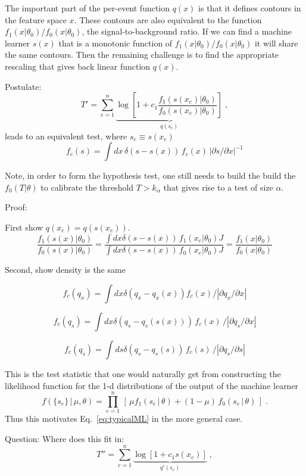 \documentclass[11pt, oneside]{article}   	%
\begin{document}
The important part of the per-event function $q(x)$ is that it defines contours in the feature space $x$. These contours are also equivalent to the function $f_1(x|\theta_0)/f_0(x|\theta_0)$, the signal-to-background ratio. If we can find a machine learner $s(x)$ that is a monotonic function of $f_1(x|\theta_0)/f_0(x|\theta_0)$ it will share the same contours. Then the remaining challenge is to find the appropriate rescaling that gives back  linear function $q(x)$. 

Postulate:
\[
T' = \sum_{e=1}^n \underbrace{\log \left[ 1+c_1\frac {f_1(s(x_e) | \theta_0) }{ f_0(s(x_e) | \theta_0) } \right]}_{q(s_e)} \;,
\]
leads to an equivalent test, where $s_e \equiv s(x_e)$
\[
f_c(s) = \int dx \, \delta(s-s(x)) \, f_c(x)  \,  |\partial s / \partial x|^{-1}
\]



Note, in order to form the hypothesis test, one still needs to build the build the $f_0(T|\theta)$ to calibrate the threshold  $T>k_\alpha$ that gives rise to a test of size $\alpha$. 



Proof:

First show $q(x_e) = q(s(x_e))$.
\[
\frac {f_1(s(x) | \theta_0) }{ f_0(s(x) | \theta_0) } = \frac { \int dx \delta(s-s(x)) \, f_1(x_e | \theta_0) J }{ \int dx \delta(s-s(x)) \, f_0(x_e | \theta_0) J } = \frac {f_1(x | \theta_0) }{ f_0(x | \theta_0) } 
\]

Second, show density is the same 

\[
f_c(q_x) = \int dx \delta(q_x-q_x(x)) f_c(x) / |\partial q_x / \partial x|
\]

\[
f_c(q_s) = \int dx \delta(q_s-q_s(s(x))) \, f_c(x) \, / |\partial q_s / \partial x|
\]


\[
f_c(q_s) = \int ds \delta(q_s-q_s(s)) \,f_c(s) \, / |\partial q_s / \partial s|
\]


This is the test statistic that one would naturally get from constructing the likelihood function for the 1-d distributions of the output of the machine learner
\begin{equation}\label{eq:NP}
f( \{s_e\} \,|\, \mu, \theta) = \prod_{e=1}^n \, \left[\, \mu f_1( s_e \, |\,  \theta)  + (1-\mu)\, f_0( s_e \,|\, \theta) \,\right] \; .
\end{equation}
Thus this motivates Eq.~\ref{eq:typicalML} in the more general case. 


Question:
Where does this fit in:
\[
T'' = \sum_{e=1}^n \underbrace{ \log \left[ 1+c_1 s(x_e) \right] }_{q'(s_e)} \;,
\]
\end{document}
